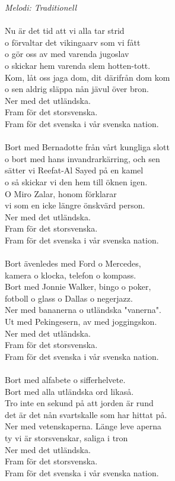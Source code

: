 {\footnotesize\textit{Melodi: Traditionell}}\\
\\
Nu är det tid att vi alla tar strid\\
o förvaltar det vikingaarv som vi fått\\
o gör oss av med varenda jugoslav\\
o skickar hem varenda slem hotten-tott.\\
Kom, låt oss jaga dom, dit därifrån dom kom\\
o sen aldrig släppa nån jävul över bron.\\
Ner med det utländska.\\
Fram för det storsvenska.\\
Fram för det svenska i vår svenska nation. \\
\\
Bort med Bernadotte från vårt kungliga slott\\
o bort med hans invandrarkärring, och sen\\
sätter vi Reefat-Al Sayed på en kamel\\
o så skickar vi den hem till öknen igen.\\
O Miro Zalar, honom förklarar\\
vi som en icke längre önskvärd person.\\
Ner med det utländska.\\
Fram för det storsvenska.\\
Fram för det svenska i vår svenska nation. \\
\\
Bort ävenledes med Ford o Mercedes,\\
kamera o klocka, telefon o kompass.\\
Bort med Jonnie Walker, bingo o poker,\\
fotboll o glass o Dallas o negerjazz.\\
Ner med bananerna o utländska "vanerna".\\
Ut med Pekingesern, av med joggingskon.\\
Ner med det utländska.\\
Fram för det storsvenska.\\
Fram för det svenska i vår svenska nation. \\
\\
Bort med alfabete o sifferhelvete.\\
Bort med alla utländska ord likaså.\\
Tro inte en sekund på att jorden är rund\\
det är det nån svartskalle som har hittat på.\\
Ner med vetenskaperna. Länge leve aperna\\
ty vi är storsvenskar, saliga i tron\\
Ner med det utländska.\\
Fram för det storsvenska.\\
Fram för det svenska i vår svenska nation. 
